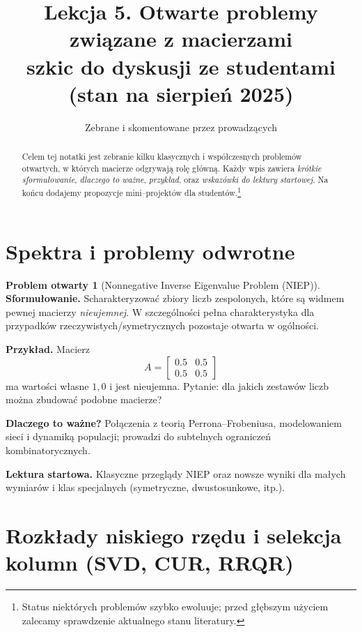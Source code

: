 \documentclass[11pt,a4paper]{article}
\title{Lekcja 5. Otwarte problemy związane z macierzami\\\large szkic do dyskusji ze studentami (stan na sierpień 2025)}
\author{Zebrane i skomentowane przez prowadzących}
\date{}
\theoremstyle{definition}
\newtheorem{openproblem}{Problem otwarty}
\begin{document}
\maketitle

\begin{abstract}
Celem tej notatki jest zebranie kilku klasycznych i współczesnych problemów otwartych, w których macierze odgrywają rolę główną. Każdy wpis zawiera \emph{krótkie sformułowanie}, \emph{dlaczego to ważne}, \emph{przykład}, oraz \emph{wskazówki do lektury startowej}. Na końcu dodajemy propozycje mini–projektów dla studentów.\footnote{Status niektórych problemów szybko ewoluuje; przed głębszym użyciem zalecamy sprawdzenie aktualnego stanu literatury.}
\end{abstract}

\tableofcontents
\bigskip

\section{Spektra i problemy odwrotne}

\begin{openproblem}[Nonnegative Inverse Eigenvalue Problem (NIEP)]\label{prob:NIEP}
\textbf{Sformułowanie.} Scharakteryzować zbiory liczb zespolonych, które są widmem pewnej macierzy \emph{nieujemnej}. W szczególności pełna charakterystyka dla przypadków rzeczywistych/symetrycznych pozostaje otwarta w ogólności.

\textbf{Przykład.} Macierz
\[
A = \begin{bmatrix} 0.5 & 0.5 \\ 0.5 & 0.5 \end{bmatrix}
\]
ma wartości własne \(1,0\) i jest nieujemna. Pytanie: dla jakich zestawów liczb można zbudować podobne macierze?

\textbf{Dlaczego to ważne?} Połączenia z teorią Perrona–Frobeniusa, modelowaniem sieci i dynamiką populacji; prowadzi do subtelnych ograniczeń kombinatorycznych.

\textbf{Lektura startowa.} Klasyczne przeglądy NIEP oraz nowsze wyniki dla małych wymiarów i klas specjalnych (symetryczne, dwustosunkowe, itp.).
\end{openproblem}

\section{Rozkłady niskiego rzędu i selekcja kolumn (SVD, CUR, RRQR)}
\end{document}
